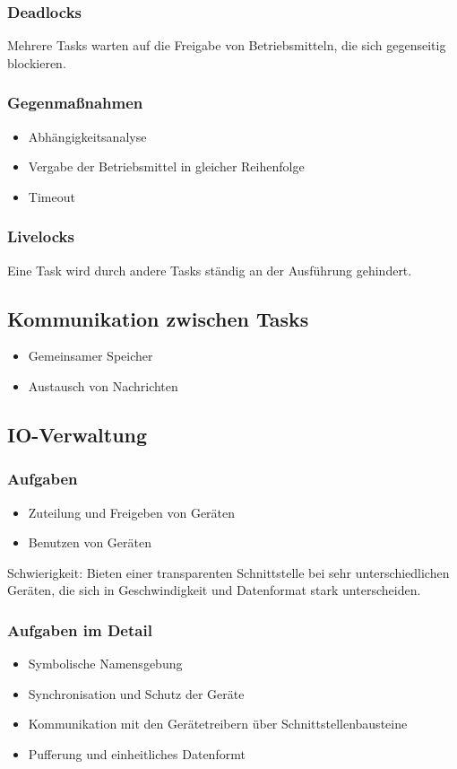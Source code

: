\subsubsection{Deadlocks}
Mehrere Tasks warten auf die Freigabe von Betriebsmitteln, die sich gegenseitig blockieren.

\subsubsection{Gegenmaßnahmen}
\begin{itemize}
	\item Abhängigkeitsanalyse
	\item Vergabe der Betriebsmittel in gleicher Reihenfolge
	\item Timeout
\end{itemize}

\subsubsection{Livelocks}
Eine Task wird durch andere Tasks ständig an der Ausführung gehindert.


\subsection{Kommunikation zwischen Tasks}
\begin{itemize}
	\item Gemeinsamer Speicher
	\item Austausch von Nachrichten
\end{itemize}


\subsection{IO-Verwaltung}

\subsubsection{Aufgaben}
\begin{itemize}
	\item Zuteilung und Freigeben von Geräten
	\item Benutzen von Geräten
\end{itemize}
Schwierigkeit: Bieten einer transparenten Schnittstelle bei sehr unterschiedlichen Geräten, die sich in Geschwindigkeit und Datenformat stark unterscheiden.

\subsubsection{Aufgaben im Detail}
\begin{itemize}
	\item Symbolische Namensgebung
	\item Synchronisation und Schutz der Geräte
	\item Kommunikation mit den Gerätetreibern über Schnittstellenbausteine
	\item Pufferung und einheitliches Datenformt
\end{itemize}

